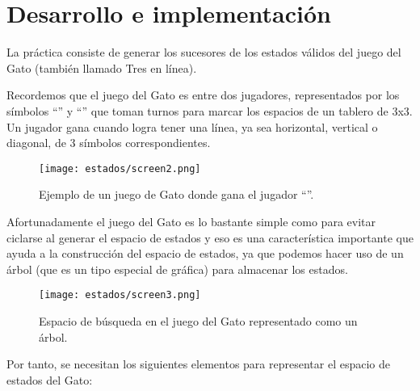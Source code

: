 \section{Desarrollo e implementaci\'on}

La práctica consiste de generar los sucesores de los estados válidos del juego del Gato (también llamado Tres en línea).\par
Recordemos que el juego del Gato es entre dos jugadores, representados por los símbolos \enquote{} y \enquote{} que toman turnos para marcar los espacios de un tablero de 3x3.
Un jugador gana cuando logra tener una línea, ya sea horizontal, vertical o diagonal, de 3 símbolos correspondientes.\par

\begin{figure}
  \centering
  \texttt{[image: estados/screen2.png]}
  \caption{Ejemplo de un juego de Gato donde gana el jugador \enquote{}. \protect\footnotemark}
  \label{fig:tictactoe}
\end{figure}


Afortunadamente el juego del Gato es lo bastante simple como para evitar ciclarse al generar el espacio de estados y eso es una característica importante que ayuda a la construcción del espacio de estados, ya que  podemos hacer uso de un árbol (que es un tipo especial de gráfica) para almacenar los estados.\par


\begin{figure}
  \centering
  \texttt{[image: estados/screen3.png]}
  \caption{Espacio de búsqueda en el juego del Gato representado como un árbol.}
  \label{fig:espaciogato}
\end{figure}

Por tanto, se necesitan los siguientes elementos para representar el espacio de estados del Gato:

